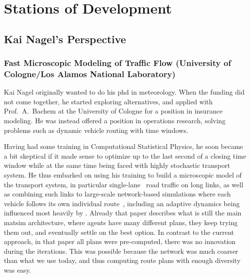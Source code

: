 \section{Stations of Development}
\subsection{Kai Nagel's Perspective}

\subsubsection{Fast Microscopic Modeling of Traffic Flow (University of Cologne/Los Alamos National Laboratory)}
\label{sec:history-u-of-cologne-phase}

Kai Nagel originally wanted to do his \acrshort{phd} 
in meteorology.  When the funding did not come together, he started exploring alternatives, and applied with Prof.\ A.\ Bachem at the University of Cologne for a position in insurance modeling.  He was instead offered a position in operations research, solving problems such as dynamic vehicle routing with time windows. 

Having had some training in Computational Statistical Physics, he soon became a bit skeptical if it made sense to optimize up to the last second of a closing time window while at the same time being faced with highly stochastic transport system.  He thus embarked on using his training to build a microscopic model of the transport system, in particular single-lane~\citep{NagelSchreckenberg1992CA,Nagel1999flowTheoTrr} road traffic on long links, as well as combining such links to large-scale network-based simulations where each vehicle follows its own individual route~\citep{Nagel1996NRW}, including an adaptive dynamics being influenced most heavily by \cite{ArthurBar}.  Already that paper \citep{Nagel1996NRW} describes what is still the main \gls{matsim} architecture, where agents have many different plans, they keep trying them out, and eventually settle on the best option.  In contrast to the current approach, in that paper all plans were pre-computed, \ie there was no innovation during the iterations.  This was possible because the network was much coarser than what we use today, and thus computing route plans with enough diversity was easy.

